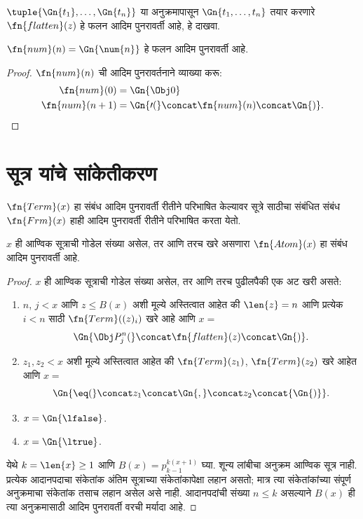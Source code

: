 \begin{prob}
$\tuple{\Gn{t_1}, \dots, \Gn{t_n}}$ या अनुक्रमापासून
$\Gn{t_1, \dots, t_n}$ तयार करणारे $\fn{flatten}(z)$ हे फलन
आदिम पुनरावर्ती आहे, हे दाखवा.
\end{prob}

\begin{prop}\label{inc:art:trm:prop:num-primrec}
  $\fn{num}(n) = \Gn{\num{n}}$ हे फलन आदिम पुनरावर्ती आहे.
\end{prop}

\begin{proof}
  $\fn{num}(n)$ ची आदिम पुनरावर्तनाने व्याख्या करू:
  \begin{align*}
    \fn{num}(0) & = \Gn{\Obj 0}\\
    \fn{num}(n+1) & = \Gn{\prime(} \concat \fn{num}(n) \concat \Gn{)}.
  \end{align*}
\end{proof}











\section{सूत्र यांचे सांकेतीकरण}\label{inc:art:frm:sec}

$\fn{Term}(x)$ हा संबंध आदिम पुनरावर्ती रीतीने परिभाषित केल्यावर
सूत्रे साठीचा संबंधित संबंध $\fn{Frm}(x)$ हाही आदिम
पुनरावर्ती रीतीने परिभाषित करता येतो.

\begin{prop}
$x$ ही आण्विक सूत्राची गोडेल संख्या असेल, तर आणि तरच
खरे असणारा $\fn{Atom}(x)$ हा संबंध आदिम पुनरावर्ती आहे.
\end{prop}

\begin{proof}
$x$ ही आण्विक सूत्राची गोडेल संख्या असेल, तर आणि तरच
पुढीलपैकी एक अट खरी असते:
\begin{enumerate}
\item $n$, $j < x$ आणि $z \le B(x)$ अशी मूल्ये अस्तित्वात आहेत की
  $\len{z}=n$ आणि प्रत्येक $i < n$ साठी $\fn{Term}((z)_i)$ खरे आहे आणि $x = $
\[\Gn{\Obj P^n_j(} \concat \fn{flatten}(z) \concat \Gn{)}.
\]
\item $z_1, z_2 < x$ अशी मूल्ये अस्तित्वात आहेत की $\fn{Term}(z_1)$,
  $\fn{Term}(z_2)$ खरे आहेत आणि $x = $
\[\Gn{{\eq}(} \concat z_1 \concat \Gn{,} \concat z_2 \concat{\Gn{)}}.
\]
  \item $x = \Gn{\lfalse}$.
  \item $x = \Gn{\ltrue}$.
\end{enumerate}
येथे $k=\len{x}\ge1$ आणि $B(x)=p_{k-1}^{k(x+1)}$ घ्या.
शून्य लांबीचा अनुक्रम आण्विक सूत्र नाही. प्रत्येक आदानपदाचा संकेतांक
अंतिम सूत्राच्या संकेतांकापेक्षा लहान असतो; मात्र त्या संकेतांकांच्या
संपूर्ण अनुक्रमाचा संकेतांक तसाच लहान असेल असे नाही. आदानपदांची
संख्या $n\le k$ असल्याने $B(x)$ ही त्या अनुक्रमासाठी आदिम पुनरावर्ती
वरची मर्यादा आहे.

\end{proof}

